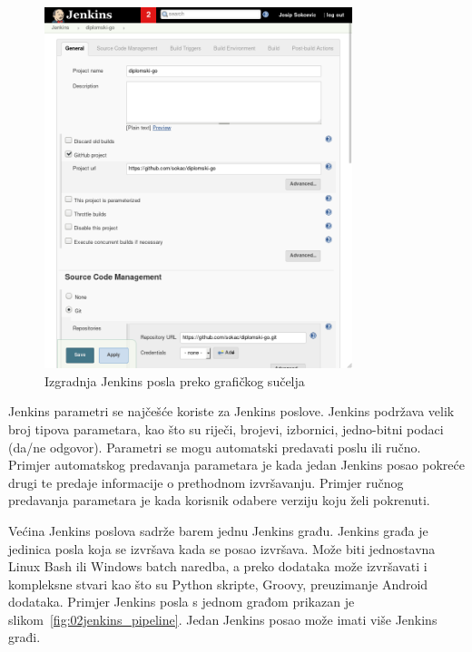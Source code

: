 \begin{figure}[h]
    \centering
    \includegraphics[width=0.8\textwidth]{img/02/jenkins_job.png}
    \caption{Izgradnja Jenkins posla preko grafičkog sučelja}%
    \label{fig:02jenkinsjob}
\end{figure}

Jenkins parametri se najčešće koriste za Jenkins poslove. Jenkins podržava velik broj tipova
parametara, kao što su riječi, brojevi, izbornici, jedno-bitni podaci (da/ne odgovor). Parametri se
mogu automatski predavati poslu ili ručno. Primjer automatskog predavanja parametara je kada jedan
Jenkins posao pokreće drugi te predaje informacije o prethodnom izvršavanju. Primjer ručnog
predavanja parametara je kada korisnik odabere verziju koju želi pokrenuti.

Većina Jenkins poslova sadrže barem jednu Jenkins građu. Jenkins građa je jedinica posla koja se
izvršava kada se posao izvršava. Može biti jednostavna Linux Bash ili Windows batch naredba, a preko
dodataka može izvršavati i kompleksne stvari kao što su Python skripte, Groovy, preuzimanje Android
dodataka. Primjer Jenkins posla s jednom građom prikazan je slikom~\ref{fig:02jenkins_pipeline}.
Jedan Jenkins posao može imati više Jenkins građi.

